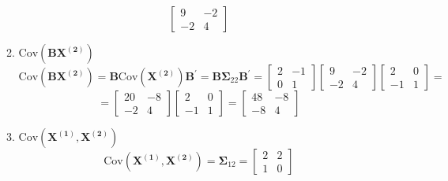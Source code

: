 \begin{enumerate}[font=\bfseries]
\begin{enumerate}
\[\begin{bmatrix}
                    9 & -2 \\
                    -2 & 4
                \end{bmatrix}
            \]
            \item $\text{Cov}\left(\mathbf{B}\mathbf{X^{(2)}}\right)$
            \[
                \text{Cov}\left(\mathbf{B}\mathbf{X^{(2)}}\right)
                =
                \mathbf{B}\text{Cov}\left(\mathbf{X^{(2)}}\right)\mathbf{B}^\prime
                =
                \mathbf{B}\mathbf{\Sigma}_{22}\mathbf{B}^\prime
                =
                \begin{bmatrix}
                    2 & -1 \\
                    0 & 1
                \end{bmatrix}
                \begin{bmatrix}
                    9 & -2 \\
                    -2 & 4
                \end{bmatrix}
                \begin{bmatrix}
                    2 & 0 \\
                    -1 & 1
                \end{bmatrix}
                =
            \]
            \[
                =
                \begin{bmatrix}
                    20 & -8 \\
                    -2 & 4
                \end{bmatrix}
                \begin{bmatrix}
                    2 & 0 \\
                    -1 & 1
                \end{bmatrix}
                = 
                \begin{bmatrix}
                    48 & -8 \\
                    -8 & 4
                \end{bmatrix}
            \]
            \item $\text{Cov}\left(\mathbf{X^{(1)}}, \mathbf{X^{(2)}}\right)$
            \[
                \text{Cov}\left(\mathbf{X^{(1)}}, \mathbf{X^{(2)}}\right)
                =
                \mathbf{\Sigma}_{12}
                =
                \begin{bmatrix}
                    2 & 2 \\
                    1 & 0
                \end{bmatrix}
\]
\end{enumerate}
\end{enumerate}
